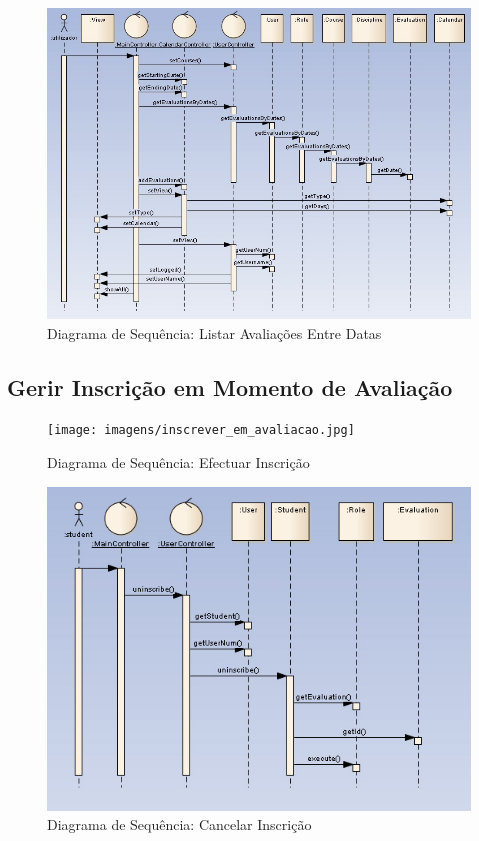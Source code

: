 \begin{figure}[!htbp]
\centering
\includegraphics{imagens/listar_entre_datas.jpg}
\caption{Diagrama de Sequência: Listar Avaliações Entre Datas}
\label{fig:listar_entre_datas}
\end{figure}




\clearpage
\subsection{Gerir Inscrição em Momento de Avaliação}

\begin{figure}[!htbp]
\centering
\texttt{[image: imagens/inscrever\_em\_avaliacao.jpg]}
\caption{Diagrama de Sequência: Efectuar Inscrição}
\label{fig:inscrever_em_avaliacao}
\end{figure}

\begin{figure}[!htbp]
\centering
\includegraphics{imagens/cancelar_inscricao.jpg}
\caption{Diagrama de Sequência: Cancelar Inscrição}
\label{fig:cancelar_inscricao}
\end{figure}

